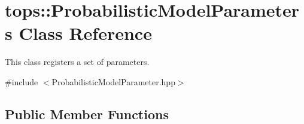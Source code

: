 \hypertarget{classtops_1_1ProbabilisticModelParameters}{}\section{tops\+:\+:Probabilistic\+Model\+Parameters Class Reference}
\label{classtops_1_1ProbabilisticModelParameters}


This class registers a set of parameters.  




{\ttfamily \#include $<$Probabilistic\+Model\+Parameter.\+hpp$>$}

\subsection*{Public Member Functions}
